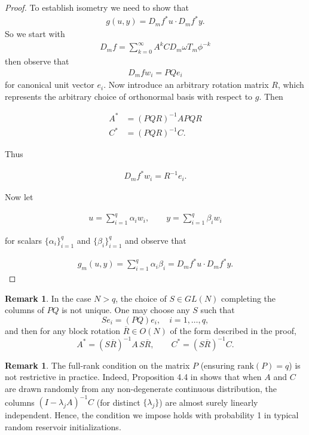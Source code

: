 \documentclass{article}
\theoremstyle{definition}
\theoremstyle{definition}
\newtheorem{remark}[theorem]{Remark}
\numberwithin{theorem}{section}
\begin{document}
\begin{proof}
To establish isometry we need to show that 
\begin{align*}
    g(u,y) = D_m f^*u \cdot D_m f^* y.
\end{align*}
So we start with
    \begin{align*}
    D_m f = \sum_{k = 0}^{\infty} A^k C D_{m} \omega T_{m} \phi^{-k}
\end{align*}
then observe that
\begin{align*}
D_m f w_i = PQ e_i 
\end{align*}
for canonical unit vector $e_i$.
Now introduce an arbitrary rotation matrix $R$, which represents the arbitrary choice of orthonormal basis with respect to $g$. Then

\begin{align*}
    A^* &= (PQR)^{-1} A P Q R \\
    C^* &= (PQR)^{-1} C.
\end{align*}

Thus

\begin{align*}
D_m f^* w_i = R^{-1} e_i.
\end{align*}

Now let

\begin{align*}
    u = \sum_{i=1}^q \alpha_i w_i, \qquad y = \sum_{i=1}^q \beta_i w_i
\end{align*}

for scalars $\{ \alpha_i \}_{i=1}^q$ and $\{ \beta_i \}_{i=1}^q$ and observe that

\begin{align*}
    g_m(u,y) = \sum_{i=1}^q \alpha_i \beta_i = D_m f^* u \cdot D_m f^* y.
\end{align*}
\end{proof}

\begin{remark}
In the case $N>q$, the choice of $S \in GL(N)$ completing the columns of $PQ$ is not unique. 
One may choose any $S$ such that 
\[
S e_i = (PQ) e_i, \quad i=1,\dots,q,
\]
and then for any block rotation $\overline{R} \in O(N)$ of the form described in the proof,
\[
    A^* = (S\overline{R})^{-1} A \, S\overline{R}, 
    \qquad 
    C^* = (S\overline{R})^{-1} C.
\]
\end{remark}

\begin{remark}
The full-rank condition on the matrix \(P\) (ensuring \(\mathrm{rank}(P)=q\)) is not restrictive in practice. Indeed, Proposition 4.4 in \cite{Grigoryeva2023} shows that when \(A\) and \(C\) are drawn randomly from any non-degenerate continuous distribution, the columns \((I-\lambda_j A)^{-1} C\) (for distinct \(\{\lambda_j\}\)) are almost surely linearly independent. Hence, the condition we impose holds with probability 1 in typical random reservoir initializations.
\end{remark}
\end{document}
